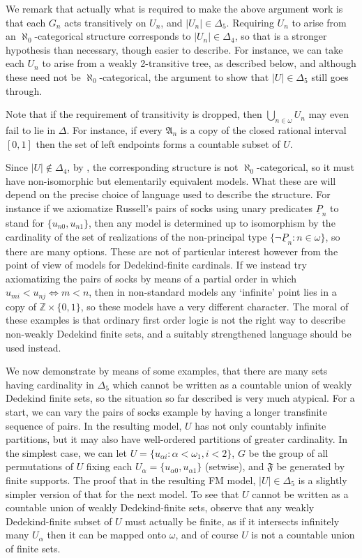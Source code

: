 \documentclass[a4paper,reqno]{amsart}
\numberwithin{equation}{section}
\begin{document}
We remark that actually what is required to make the above argument work is that each $G_n$ acts transitively on $U_n$,
and $|U_n| \in \Delta_5$. Requiring $U_n$ to arise from an $\aleph_0$-categorical structure corresponds to 
$|U_n| \in \Delta_4$, so that is a stronger hypothesis than necessary, though easier to describe. For instance, we can
take each $U_n$ to arise from a weakly 2-transitive tree, as described below, and although these need not be 
$\aleph_0$-categorical, the argument to show that $|U| \in \Delta_5$ still goes through.

Note that if the requirement of transitivity is dropped, then $\bigcup_{n \in \omega}U_n$ may even fail to lie in
$\Delta$. For instance, if every ${\mathfrak A}_n$ is a copy of the closed rational interval $[0, 1]$ then the set of
left endpoints forms a countable subset of $U$.

Since $|U| \not \in \Delta_4$, by \cite{Walczak}, the corresponding structure is not $\aleph_0$-categorical, so it must
have non-isomorphic but elementarily equivalent models. What these are will depend on the precise choice of language
used to describe the structure. For instance if we axiomatize Russell's pairs of socks using unary predicates 
${\underline P}_n$ to stand for $\{u_{n0}, u_{n1}\}$, then any model is determined up to isomorphism by the 
cardinality of the set of realizations of the non-principal type $\{\neg {\underline P}_n: n \in \omega\}$, so there
are many options. These are not of particular interest however from the point of view of models for Dedekind-finite
cardinals. If we instead try axiomatizing the pairs of socks by means of a partial order in which
$u_{mi} < u_{nj} \Leftrightarrow m < n$, then in non-standard models any `infinite' point lies in a copy of 
${\mathbb Z} \times \{0, 1\}$, so these models have a very different character. The moral of these examples is that
ordinary first order logic is not the right way to describe non-weakly Dedekind finite sets, and a suitably
strengthened language should be used instead.

We now demonstrate by means of some examples, that there are many sets having cardinality in $\Delta_5$ which
cannot be written as a countable union of weakly Dedekind finite sets, so the situation so far described is
very much atypical. For a start, we can vary the pairs of socks example by having a longer transfinite sequence 
of pairs. In the resulting model, $U$ has not only countably infinite partitions, but it may also have well-ordered 
partitions of greater cardinality. In the simplest case, we can let $U = \{u_{\alpha i}: \alpha < \omega_1, i < 2\}$, 
$G$ be the group of all permutations of $U$ fixing each $U_\alpha = \{u_{\alpha 0}, u_{\alpha 1}\}$ (setwise), and 
$\mathfrak F$ be generated by finite supports. The proof that in the resulting FM model, $|U| \in \Delta_5$ is a
slightly simpler version of that for the next model. To see that $U$ cannot be written as a countable union of 
weakly Dedekind-finite sets, observe that any weakly Dedekind-finite subset of $U$ must actually be finite, as
if it intersects infinitely many $U_\alpha$ then it can be mapped onto $\omega$, and of course $U$ is not a countable
union of finite sets.
\end{document}
